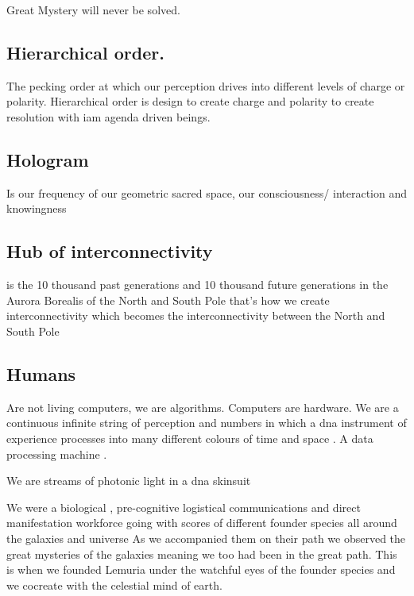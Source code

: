 Great Mystery will never be solved.

\subsection{Hierarchical order.}\label{hierarchical-order.}

The pecking order at which our perception drives into different levels
of charge or polarity. Hierarchical order is design to create charge and
polarity to create resolution with iam agenda driven beings.

\subsection{Hologram}\label{hologram}

Is our frequency of our geometric sacred space, our consciousness/
interaction and knowingness

\subsection{Hub of interconnectivity}\label{hub-of-interconnectivity}

is the 10 thousand past generations and 10 thousand future generations
in the Aurora Borealis of the North and South Pole that's how we create
interconnectivity which becomes the interconnectivity between the North
and South Pole

\subsection{Humans}\label{humans}

Are not living computers, we are algorithms. Computers are hardware. We
are a continuous infinite string of perception and numbers in which a
dna instrument of experience processes into many different colours of
time and space . A data processing machine .

We are streams of photonic light in a dna skinsuit

We were a biological , pre-cognitive logistical communications and
direct manifestation workforce going with scores of different founder
species all around the galaxies and universe As we accompanied them on
their path we observed the great mysteries of the galaxies meaning we
too had been in the great path. This is when we founded Lemuria under
the watchful eyes of the founder species and we cocreate with the
celestial mind of earth.

